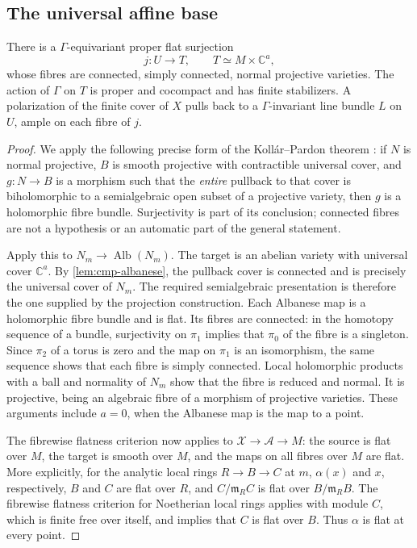 \subsection{The universal affine base}

\begin{proposition}
\label{prop:cmp-affine-base}
There is a $\Gamma$-equivariant proper flat surjection
\[
                    j:U\longrightarrow T,
          \qquad T\simeq M\times\mathbb{C}^a,
\]
whose fibres are connected, simply connected, normal projective varieties.  The action of $\Gamma$ on $T$ is proper and cocompact and has finite stabilizers.  A polarization of the finite cover of $X$ pulls back to a $\Gamma$-invariant line bundle $L$ on $U$, ample on each fibre of $j$.
\end{proposition}

\begin{proof}
We apply the following precise form of the Koll\'ar--Pardon theorem \cite[arXiv version~2, Theorem~20]{KollarPardon2012}: if $N$ is normal projective, $B$ is smooth projective with contractible universal cover, and $g:N\to B$ is a morphism such that the \emph{entire} pullback to that cover is biholomorphic to a semialgebraic open subset of a projective variety, then $g$ is a holomorphic fibre bundle.  Surjectivity is part of its conclusion; connected fibres are not a hypothesis or an automatic part of the general statement.

Apply this to $N_m\to\operatorname{Alb}(N_m)$.  The target is an abelian variety with universal cover $\mathbb{C}^a$.  By \cref{lem:cmp-albanese}, the pullback cover is connected and is precisely the universal cover of $N_m$.  The required semialgebraic presentation is therefore the one supplied by the projection construction.  Each Albanese map is a holomorphic fibre bundle and is flat.  Its fibres are connected: in the homotopy sequence of a bundle, surjectivity on $\pi_1$ implies that $\pi_0$ of the fibre is a singleton.  Since $\pi_2$ of a torus is zero and the map on $\pi_1$ is an isomorphism, the same sequence shows that each fibre is simply connected.  Local holomorphic products with a ball and normality of $N_m$ show that the fibre is reduced and normal.  It is projective, being an algebraic fibre of a morphism of projective varieties.  These arguments include $a=0$, when the Albanese map is the map to a point.

The fibrewise flatness criterion now applies to $\mathcal{X}\to\mathcal{A}\to M$: the source is flat over $M$, the target is smooth over $M$, and the maps on all fibres over $M$ are flat.  More explicitly, for the analytic local rings $R\to B\to C$ at $m$, $\alpha(x)$ and $x$, respectively, $B$ and $C$ are flat over $R$, and $C/\mathfrak{m}_R C$ is flat over $B/\mathfrak{m}_R B$.  The fibrewise flatness criterion for Noetherian local rings \cite[Tag~\href{https://stacks.math.columbia.edu/tag/00MP}{00MP}]{Stacks} applies with module $C$, which is finite free over itself, and implies that $C$ is flat over $B$.  Thus $\alpha$ is flat at every point.


\end{proof}
